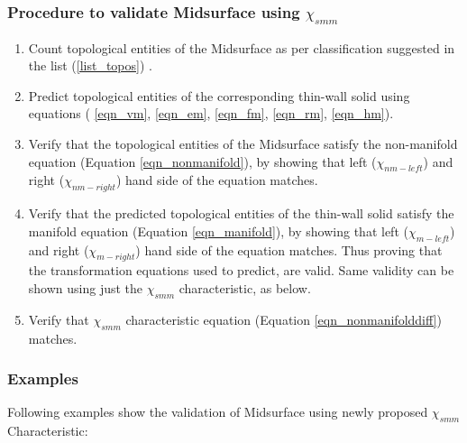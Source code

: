 \subsubsection{Procedure to validate Midsurface using  $\chi_{smm}$}
\begin{enumerate}
\item Count topological entities of the Midsurface as per classification suggested in the list (\ref{list_topos}) .
\item Predict topological entities of the corresponding thin-wall solid using equations ( \ref{eqn_vm}, \ref{eqn_em}, \ref{eqn_fm}, \ref{eqn_rm}, \ref{eqn_hm}).
\item Verify that the topological entities of the Midsurface satisfy the non-manifold equation (Equation \ref{eqn_nonmanifold}), by showing that left ($\chi_{nm-left}$) and right  ($\chi_{nm-right}$) hand side of the equation matches.
\item Verify that the predicted topological entities of the  thin-wall solid satisfy the manifold equation (Equation \ref{eqn_manifold}), by showing that left ($\chi_{m-left}$) and right  ($\chi_{m-right}$) hand side of the equation matches. Thus proving that the transformation equations used to predict, are valid. Same validity can be shown using just the $\chi_{smm}$ characteristic, as below.
\item Verify that  $\chi_{smm}$ characteristic equation (Equation \ref{eqn_nonmanifolddiff}) matches. 
\end{enumerate}



\subsubsection{Examples}
Following examples show the validation of Midsurface using newly proposed $\chi_{smm}$ Characteristic:

\vspace{2mm}

